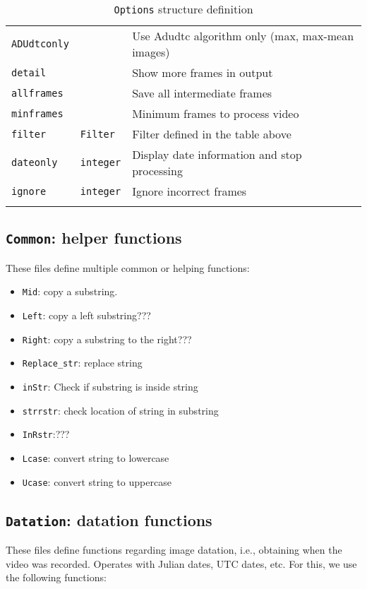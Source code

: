 \documentclass[a4paper,11pt]{memoir}
\begin{document}
\begin{center}
\begin{longtable}{|m{}|m{}|m{}|}
\texttt{ADUdtconly} & & Use Adudtc algorithm only (max, max-mean images) \\ \cline{1-1} \cline{3-3}
\texttt{detail} & & Show more frames in output \\ \cline{1-1} \cline{3-3}
\texttt{allframes} & & Save all intermediate frames \\ \cline{1-1} \cline{3-3}
\texttt{minframes} &  & Minimum frames to process video \\ \hline
\texttt{filter} & \texttt{Filter} & Filter defined in the table above \\ \hline
\texttt{dateonly} & \texttt{integer} & Display date information and stop processing \\ \hline
\texttt{ignore} & \texttt{integer} & Ignore incorrect frames \\ \hline
\caption{\texttt{Options} structure definition}
\label{my-label}
\end{longtable}
\end{center}

\subsection{\texttt{Common}: helper functions}

These files define multiple common or helping functions:
\begin{itemize}
\item  \texttt{Mid}: copy a substring.
\item  \texttt{Left}: copy a left substring???
\item  \texttt{Right}: copy a substring to the right???
\item  \texttt{Replace\_str}: replace string
\item  \texttt{inStr}: Check if substring is inside string
\item  \texttt{strrstr}: check location of string in substring
\item  \texttt{InRstr}:???
\item \texttt{Lcase}: convert string to lowercase
\item \texttt{Ucase}: convert string to uppercase
\end{itemize}

\subsection{\texttt{Datation}: datation functions}

These files define functions regarding image datation, i.e., obtaining when the video was recorded. Operates with Julian dates, UTC dates, etc. For this, we use the following functions:
\end{document}

